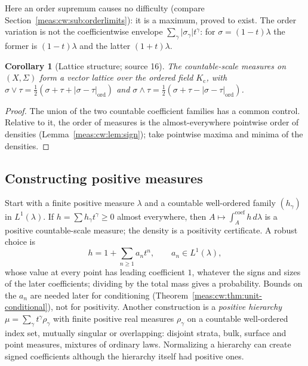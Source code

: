 \documentclass[11pt]{article}
\numberwithin{equation}{section}
\newtheorem{corollary}[theorem]{Corollary}
\theoremstyle{definition}
\theoremstyle{remark}
\newcommand{\abs}[1]{\lvert#1\rvert}
\newcommand{\Kc}{K_{\mathrm c}}
\newcommand{\intc}{\mathop{\int}\nolimits^{\mathrm{coef}}}
\begin{document}
Here an order supremum causes no difficulty (compare
Section~\ref{meas:cw:sub:orderlimits}): it is a maximum, proved to exist. The
order variation is not the coefficientwise envelope
$\sum_\gamma\abs{\sigma_\gamma}t^\gamma$: for $\sigma=(1-t)\lambda$ the former is
$(1-t)\lambda$ and the latter $(1+t)\lambda$.

\begin{corollary}[Lattice structure; source 16]\label{meas:cw:cor:lattice}
The countable-scale measures on $(X,\Sigma)$ form a vector lattice over the
ordered field $\Kc$, with
$\sigma\vee\tau=\frac12(\sigma+\tau+\abs{\sigma-\tau}_{\mathrm{ord}})$ and
$\sigma\wedge\tau=\frac12(\sigma+\tau-\abs{\sigma-\tau}_{\mathrm{ord}})$.
\end{corollary}
\begin{proof}
The union of the two countable coefficient families has a common control.
Relative to it, the order of measures is the almost-everywhere pointwise order
of densities (Lemma~\ref{meas:cw:lem:sign}); take pointwise maxima and minima of
the densities.
\end{proof}

\subsection{Constructing positive measures}

Start with a finite positive measure $\lambda$ and a countable well-ordered
family $(h_\gamma)$ in $L^1(\lambda)$. If $h=\sum h_\gamma t^\gamma\ge0$ almost
everywhere, then $A\mapsto\intc_Ah\,d\lambda$ is a positive countable-scale
measure; the density is a positivity certificate. A robust choice is
\begin{equation}\label{meas:cw:eq:unit-density}
 h=1+\sum_{n\ge1}a_nt^n,\qquad a_n\in L^1(\lambda),
\end{equation}
whose value at every point has leading coefficient $1$, whatever the signs and
sizes of the later coefficients; dividing by the total mass gives a
probability. Bounds on the $a_n$ are needed later for conditioning
(Theorem~\ref{meas:cw:thm:unit-conditional}), not for positivity. Another
construction is a \emph{positive hierarchy} $\mu=\sum_\gamma t^\gamma\rho_\gamma$ with
finite positive real measures $\rho_\gamma$ on a countable well-ordered index set,
mutually singular or overlapping: disjoint strata, bulk, surface and point
measures, mixtures of ordinary laws. Normalizing a hierarchy can create signed
coefficients although the hierarchy itself had positive ones.
\end{document}
